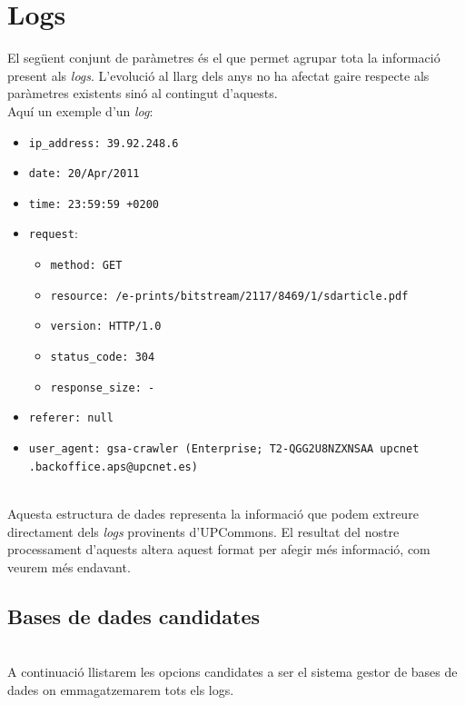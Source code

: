 \section{Logs}\label{sec:logs-storing}

El següent conjunt de paràmetres és el que permet agrupar tota la informació present als \textit{\gls{log}s}.
L’evolució al llarg dels anys no ha afectat gaire respecte als paràmetres existents sinó al contingut d’aquests. \\

\noindent
Aquí un exemple d’un \textit{log}:

\begin{itemize}
    \item \texttt{ip\_address:  39.92.248.6}
    \item \texttt{date: 20/Apr/2011}
    \item \texttt{time: 23:59:59 +0200}
    \item \texttt{request}:
    \begin{itemize}
        \item \texttt{method: GET}
        \item \texttt{resource: /e-prints/bitstream/2117/8469/1/sdarticle.pdf}
        \item \texttt{version: HTTP/1.0}
        \item \texttt{status\_code: 304}
        \item \texttt{response\_size: -}
    \end{itemize}
    \item \texttt{referer: null}
    \item \texttt{user\_agent:  gsa-crawler (Enterprise; T2-QGG2U8NZXNSAA upcnet\\.backoffice.aps@upcnet.es)}
\end{itemize}


\noindent \\
Aquesta estructura de dades representa la informació que podem extreure directament dels \textit{\gls{log}s} provinents d'\gls{UPCommons}.
El resultat del nostre processament d'aquests altera aquest format per afegir més informació, com veurem més endavant.

\clearpage

\subsection{Bases de dades candidates}\label{subsec:log-db-options}

\noindent \\
A continuació llistarem les opcions candidates a ser el sistema gestor de bases de dades on emmagatzemarem tots els logs.

